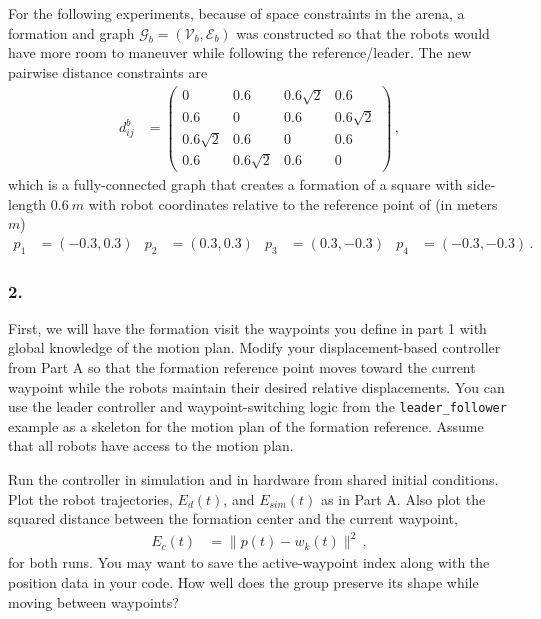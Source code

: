 \documentclass[11pt]{article}
\begin{document}
For the following experiments, because of space constraints in the arena, a formation and graph $\mathcal G_b=(\mathcal V_b,\mathcal E_b)$ was constructed so that the robots would have more room to maneuver while following the reference/leader. The new pairwise distance constraints are
\begin{align}\label{eqn:graph_b}
    d_{ij}^b&=\begin{pmatrix}
        0 & 0.6 & 0.6\sqrt 2 & 0.6\\
        0.6 & 0 & 0.6 & 0.6\sqrt 2\\
        0.6\sqrt 2 & 0.6 & 0 & 0.6\\
        0.6 & 0.6\sqrt 2 & 0.6 & 0
    \end{pmatrix}\,,
\end{align}
which is a fully-connected graph that creates a formation of a square with side-length $0.6\ m$ with robot coordinates relative to the reference point of (in meters $m$)
\begin{align}\label{eqn:p_b}
    p_1&=(-0.3,0.3) & p_2&=(0.3,0.3) & p_3&=(0.3,-0.3) & p_4&=(-0.3,-0.3)\,.
\end{align}

\FloatBarrier
\subsubsection*{2.}
First, we will have the formation visit the waypoints you define in part 1 with global knowledge of the motion plan. Modify your displacement-based controller from Part A so that the formation reference point moves toward the current waypoint while the robots maintain their desired relative displacements. You can use the leader controller and waypoint-switching logic from the \texttt{leader\_follower} example as a skeleton for the motion plan of the formation reference. Assume that all robots have access to the motion plan.

Run the controller in simulation and in hardware from shared initial conditions. Plot the robot trajectories, $E_d(t)$, and $E_{sim}(t)$ as in Part A. Also plot the squared distance between the formation center and the current waypoint,
\begin{align*}
    E_c(t)&=\|p(t)-w_k(t)\|^2\,,
\end{align*}
for both runs. You may want to save the active-waypoint index along with the position data in your code. How well does the group preserve its shape while moving between waypoints?
\end{document}
